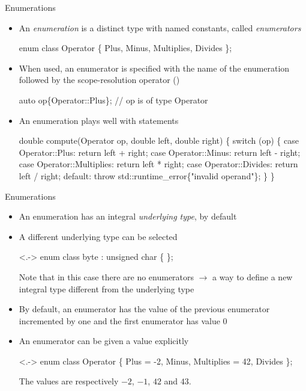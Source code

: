 \begin{frame}[fragile]{Enumerations}

  \begin{itemize}[<+->]
  \item An \textit{enumeration} is a distinct type with named constants, called
    \textit{enumerators}

  \begin{codeblock}
enum class Operator \{ Plus, Minus, Multiplies, Divides \};\end{codeblock}

  \item When used, an enumerator is specified with the name of the enumeration
    followed by the scope-resolution operator (\code{::})

    \begin{codeblock}
auto op\{Operator::Plus\}; // op is of type Operator\end{codeblock}

  \item An enumeration plays well with  statements

    \begin{codeblock}
double compute(Operator op, double left, double right)
\{
  switch (op) \{
    case Operator::Plus:       return left + right;
    case Operator::Minus:      return left - right;
    case Operator::Multiplies: return left * right;
    case Operator::Divides:    \ddd return left / right;
    default: throw std::runtime_error\{"invalid operand"\};
  \}
\}\end{codeblock}

  \end{itemize}
\end{frame}

\begin{frame}[fragile]{Enumerations \insertcontinuationtext}

  \begin{itemize}[<+->]
  \item An enumeration has an integral \textit{underlying type}, by default 
  \item A different underlying type can be selected
    \begin{codeblock}<.->{
enum class byte : unsigned char \{ \};}\end{codeblock}

    Note that in this case there are no enumerators $\rightarrow$ a way to define a
    new integral type different from the underlying type

  \item By default, an enumerator has the value of the previous enumerator
    incremented by one and the first enumerator has value $0$
  \item An enumerator can be given a value explicitly
    \begin{codeblock}<.->{
enum class Operator \{ Plus = -2, Minus, Multiplies = 42, Divides \};}\end{codeblock}
    The values are respectively $-2$, $-1$, $42$ and $43$.
  \end{itemize}

\end{frame}

